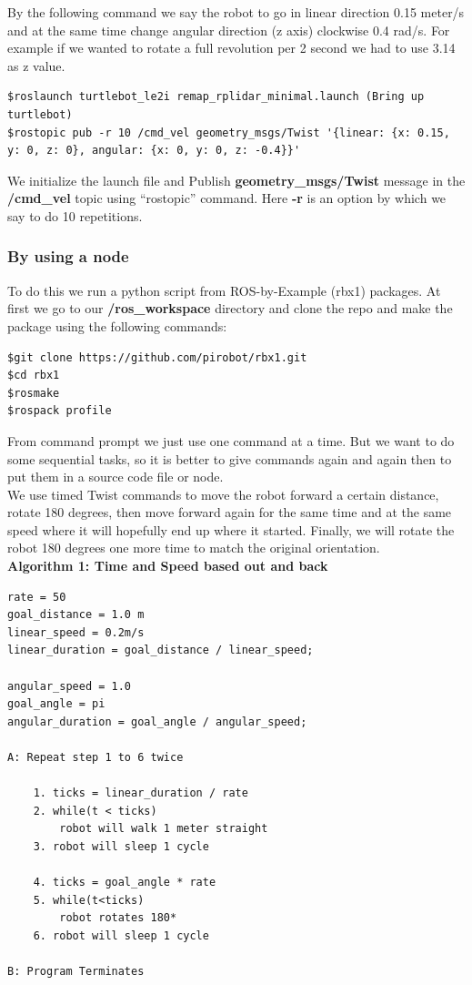 \documentclass[10pt,a4paper]{article}
\begin{document}
By the following command we say the robot to go in linear direction 0.15 meter/s and at the same time change angular direction (z axis) clockwise 0.4 rad/s. For example if we wanted to rotate a full revolution per 2 second we had to use 3.14 as z value.
\begin{lstlisting}[frame=single] 
$roslaunch turtlebot_le2i remap_rplidar_minimal.launch (Bring up turtlebot)
$rostopic pub -r 10 /cmd_vel geometry_msgs/Twist '{linear: {x: 0.15, y: 0, z: 0}, angular: {x: 0, y: 0, z: -0.4}}'
\end{lstlisting}
We initialize the launch file and Publish \textbf{geometry\_msgs/Twist} message in the \textbf{/cmd\_vel} topic using ``rostopic'' command. Here \textbf{-r} is an option by which we say to do 10 repetitions.

\subsubsection{By using a node}
To do this we run a python script from ROS-by-Example (rbx1) packages. At first we go to our \textbf{/ros\_workspace} directory and clone the repo and make the package using the following commands:

\begin{lstlisting}[frame=single] 
$git clone https://github.com/pirobot/rbx1.git
$cd rbx1
$rosmake
$rospack profile
\end{lstlisting}

From command prompt we just use one command at a time. But we want to do some sequential tasks, so it is better to give commands again and again then to put them in a source code file or node. \\
We use timed Twist commands to move the robot forward a certain distance, rotate 180 degrees, then move forward again for the same time and at the same speed where it will hopefully end up where it started. Finally, we will rotate the robot 180 degrees one more time to match the original orientation.\\

\textbf{Algorithm 1: Time and Speed based out and back}
\begin{lstlisting}[frame=single]
rate = 50
goal_distance = 1.0 m
linear_speed = 0.2m/s
linear_duration = goal_distance / linear_speed;

angular_speed = 1.0
goal_angle = pi
angular_duration = goal_angle / angular_speed;

A: Repeat step 1 to 6 twice

	1. ticks = linear_duration / rate
	2. while(t < ticks)
		robot will walk 1 meter straight
	3. robot will sleep 1 cycle
	
	4. ticks = goal_angle * rate
	5. while(t<ticks)
		robot rotates 180*
	6. robot will sleep 1 cycle
	
B: Program Terminates
\end{lstlisting}
\end{document}
